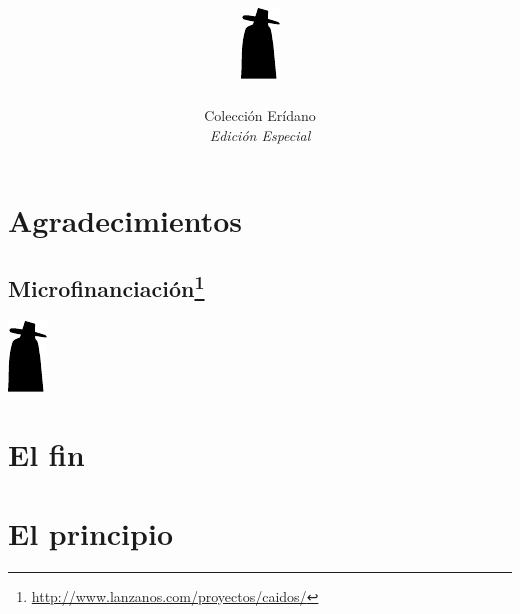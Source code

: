 \documentclass[11pt]{book}
\title{
    \vspace*{\stretch{.7}}
    \includegraphics{images/minicaido}\\
    \medskip
    \textbf{\Huge\titlename}
    \setcounter{page}{3}
}
\author{\textit{\authorname}}
\date{
    \vspace*{\stretch{1}}
    {\small Colección Erídano}\\
    \emph{\scriptsize Edición Especial}
}
\begin{document}
\pagestyle{empty}
\hbox{}\cleardoublepage
\maketitle


\hbox{}\cleardoublepage


\chapter*{Agradecimientos}
\thispagestyle{empty}
\begin{small}
    
\end{small}

\renewcommand{\thefootnote}{\fnsymbol{footnote}}
\section*{Microfinanciación\footnote{\url{http://www.lanzanos.com/proyectos/caidos/}}}
\thispagestyle{empty}
\begin{small}
    
\end{small}
\renewcommand{\thefootnote}{\arabic{footnote}}

\newpage\thispagestyle{empty}
\begin{center}
    \includegraphics{images/minicaido}
\end{center}


\pagestyle{fancyplain}
\chapter{El fin}


\chapter{El principio}

\end{document}
